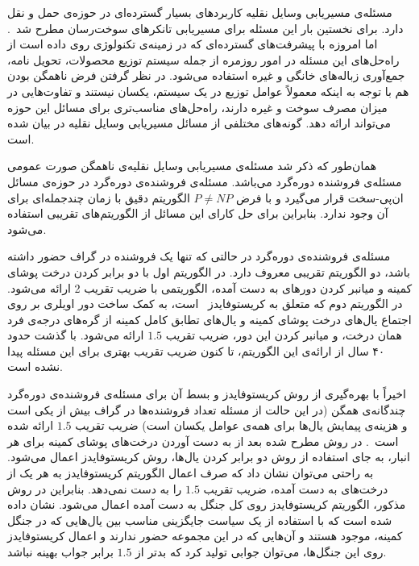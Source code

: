 
مسئله‌ی مسیریابی وسایل نقلیه کاربردهای بسیار گسترده‌ای در حوزه‌ی حمل و نقل دارد. برای نخستین بار این مسئله برای مسیریابی تانکرهای سوخت‌رسان مطرح شد~\cite{Dantzig}. اما امروزه با پیشرفت‌های گسترده‌ای که در زمینه‌ی تکنولوژی روی داده است از راه‌حل‌های این مسئله در امور روزمره از جمله سیستم توزیع محصولات، تحویل نامه، جمع‌آوری زباله‌های خانگی و غیره استفاده می‌شود. در نظر گرفتن فرض ناهمگن بودن هم با توجه به اینکه معمولاً عوامل توزیع در یک سیستم، یکسان نیستند و تفاوت‌هایی در میزان مصرف سوخت و غیره دارند، راه‌حل‌های مناسب‌تری برای مسائل این حوزه می‌تواند ارائه دهد.
گونه‌های مختلفی از مسائل مسیریابی وسایل نقلیه در 
بیان شده است.



همان‌طور که ذکر شد مسئله‌ی مسیریابی وسایل نقلیه‌ی ناهمگن صورت عمومی مسئله‌ی فروشنده دوره‌گرد می‌باشد. 
مسئله‌ی فروشنده‌ی دوره‌گرد در حوزه‌ی مسائل ان‌پی-سخت قرار می‌گیرد و با فرض $P \neq NP$ الگوریتم دقیق با زمان چندجمله‌ای برای آن وجود ندارد. بنابراین برای حل کارای این مسائل از الگوریتم‌های تقریبی  استفاده می‌شود.

مسئله‌ی فروشنده‌ی دوره‌گرد در حالتی که تنها یک فروشنده در گراف حضور داشته باشد، دو الگوریتم تقریبی معروف دارد.
در الگوریتم اول با دو برابر کردن درخت پوشای کمینه و میانبر کردن دورهای به دست آمده، الگوریتمی با ضریب تقریب 2 ارائه می‌شود.
در الگوریتم دوم که متعلق به کریستوفایدز~\cite{Christofides} است، به کمک ساخت دور اویلری بر روی اجتماع یال‌های درخت پوشای کمینه و یال‌های تطابق کامل کمینه از گره‌های درجه‌ی فرد همان درخت، و میانبر کردن این دور، ضریب تقریب $1.5$  ارائه می‌شود.
با گذشت حدود ۴۰ سال از ارائه‌ی این الگوریتم، تا کنون 
ضریب تقریب بهتری برای این مسئله پیدا نشده است.

اخیراً با بهره‌گیری از روش کریستوفایدز و بسط آن برای مسئله‌ی فروشنده‌ی دوره‌گرد چندگانه‌ی همگن (در این حالت از مسئله تعداد فروشنده‌ها در گراف بیش از یکی است و هزینه‌ی پیمایش یال‌ها برای همه‌ی عوامل یکسان است) ضریب تقریب $1.5$ ارائه شده است~\cite{Xu}. در روش مطرح شده بعد از به دست آوردن درخت‌های پوشای کمینه برای هر انبار، به جای استفاده از روش دو برابر کردن یال‌ها، روش کریستوفایدز اعمال می‌شود. به راحتی می‌توان نشان داد که صرف اعمال الگوریتم کریستوفایدز به هر یک از درخت‌های به دست آمده، ضریب تقریب  $1.5$ را به دست نمی‌دهد. بنابراین در روش مذکور، الگوریتم کریستوفایدز روی کل جنگل به دست آمده اعمال می‌شود. نشان داده شده است که با استفاده از یک سیاست جایگزینی مناسب بین یال‌هایی که در جنگل کمینه، موجود هستند و آن‌هایی که در این مجموعه حضور ندارند و اعمال کریستوفایدز روی این جنگل‌ها، می‌توان جوابی تولید کرد که بدتر از $1.5$ برابر جواب بهینه نباشد.



